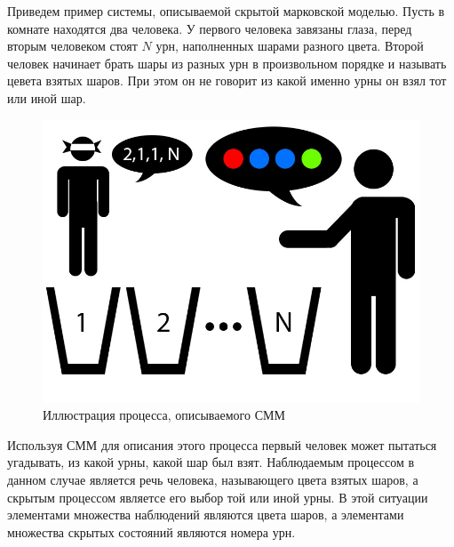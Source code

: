 Приведем пример системы, описываемой скрытой марковской моделью. Пусть в комнате находятся два человека. У первого человека завязаны глаза, перед вторым человеком стоят \(N\) урн, наполненных шарами разного цвета. Второй человек начинает брать шары из разных урн в произвольном порядке и называть цевета взятых шаров. При этом он не говорит из какой именно урны он взял тот или иной шар. 
\begin{figure}[H]
	\centering
	\includegraphics[scale=0.7]{img/hmm.jpg}
	\caption{Иллюстрация процесса, описываемого СММ}
\end{figure}
Используя СММ для описания этого процесса первый человек может пытаться угадывать, из какой урны, какой шар был взят. Наблюдаемым процессом в данном случае является речь человека, называющего цвета взятых шаров, а скрытым процессом являетсе его выбор той или иной урны. В этой ситуации элементами множества наблюдений являются цвета шаров, а элементами множества скрытых состояний являются номера урн.

